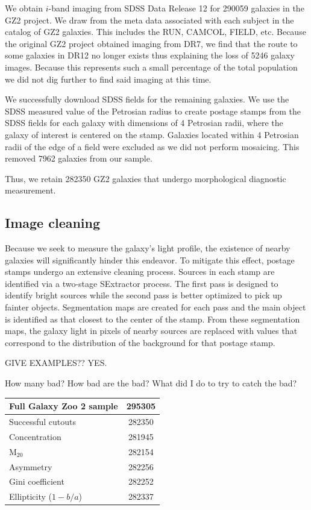 We obtain $i$-band imaging from SDSS Data Release 12 for 290059 galaxies in the GZ2 project. We draw from the meta data associated with each subject in the catalog of GZ2 galaxies. This includes the RUN, CAMCOL, FIELD, etc. Because the original GZ2 project obtained imaging from DR7, we find that the route to some galaxies in DR12 no longer exists thus explaining the loss of 5246 galaxy images. Because this represents such a small percentage of the total population we did not dig further to find said imaging at this time. 

We successfully download SDSS fields for the remaining galaxies. We use the SDSS measured value of the Petrosian radius to create postage stamps from the SDSS fields for each galaxy with dimensions of 4 Petrosian radii, where the galaxy of interest is centered on the stamp. Galaxies located within 4 Petrosian radii of the edge of a field were excluded as we did not perform mosaicing. This removed 7962 galaxies from our sample.

Thus, we retain 282350 GZ2 galaxies that undergo morphological diagnostic measurement. 

\subsection{Image cleaning}
Because we seek to measure the galaxy's light profile, the existence of nearby galaxies will significantly hinder this endeavor. To mitigate this effect, postage stamps undergo an extensive cleaning process. Sources in each stamp are identified via a two-stage SExtractor \citep[ver. 2.8.6;][]{sextractor} process. The first pass is designed to identify bright sources while the second pass is better optimized to pick up fainter objects. Segmentation maps are created for each pass and the main object is identified as that closest to the center of the stamp.  From these segmentation maps, the galaxy light in pixels of nearby sources are replaced with values that correspond to the distribution of the background for that postage stamp. 

 GIVE EXAMPLES??  YES. 

 How many bad? How bad are the bad? What did I do to try to catch the bad? 

\begin{table}
	\begin{tabular}{|l|c|}
		\hline
		Full Galaxy Zoo 2 sample 	& 295305 \\
		\hline
		\hline
		Successful cutouts 			& 282350 \\
		Concentration				& 281945 \\
		M$_{20}$					& 282154 \\
		Asymmetry 					& 282256 \\
		Gini coefficient			& 282252 \\
		Ellipticity ($1 - b/a$)		& 282337 \\
		\hline
	\end{tabular}
\end{table}


